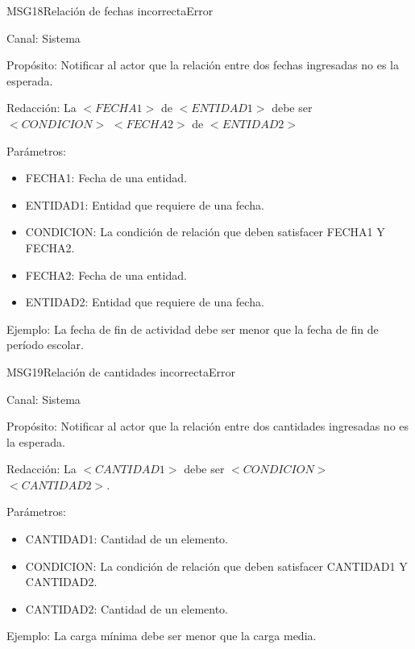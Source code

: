 \begin{mensaje}{MSG18}{Relación de fechas incorrecta}{Error}
	\item[Canal:] Sistema
	\item[Propósito:] Notificar al actor que la relación entre dos fechas ingresadas no es la esperada.
	\item[Redacción:] La $<FECHA1>$ de $<ENTIDAD1>$ debe ser $<CONDICION>$ $<FECHA2>$ de $<ENTIDAD2>$
	\item[Parámetros:] 
	\begin{itemize}
		\item FECHA1: Fecha de una entidad.
		\item ENTIDAD1: Entidad que requiere de una fecha.
		\item CONDICION: La condición de relación que deben satisfacer FECHA1 Y FECHA2.
		\item FECHA2: Fecha de una entidad.
		\item ENTIDAD2: Entidad que requiere de una fecha.
	\end{itemize}
	\item[Ejemplo:] La fecha de fin de actividad debe ser menor que la fecha de fin de período escolar.
\end{mensaje}

\begin{mensaje}{MSG19}{Relación de cantidades incorrecta}{Error}
	\item[Canal:] Sistema
	\item[Propósito:] Notificar al actor que la relación entre dos cantidades ingresadas no es la esperada.
	\item[Redacción:] La $<CANTIDAD1>$ debe ser $<CONDICION>$ $<CANTIDAD2>$.
	\item[Parámetros:] 
	\begin{itemize}
		\item CANTIDAD1: Cantidad de un elemento.
		\item CONDICION: La condición de relación que deben satisfacer CANTIDAD1 Y CANTIDAD2.
		\item CANTIDAD2: Cantidad de un elemento.
	\end{itemize}
	\item[Ejemplo:] La carga mínima debe ser menor que la carga media.
	
\end{mensaje}


